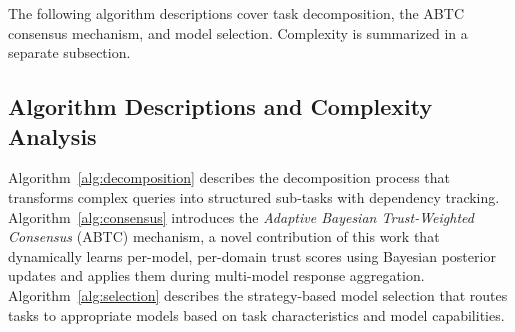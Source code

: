 \documentclass{iopjournal}
\newenvironment{algorithmic}[1][]{\begin{quote}\small}{\end{quote}}
\newcommand{\Require}{\textbf{Require:} }
\newcommand{\Ensure}{\textbf{Ensure:} }
\newcommand{\State}{\par\noindent}
\newcommand{\Comment}[1]{\hfill{\footnotesize(\textit{##1})}}
\newcommand{\For}[1]{\par\noindent\textbf{for} ##1 \textbf{do}}
\newcommand{\EndFor}{\par\noindent\textbf{end for}}
\newcommand{\If}[1]{\par\noindent\textbf{if} ##1 \textbf{then}}
\newcommand{\EndIf}{\par\noindent\textbf{end if}}
\newcommand{\Return}{\par\noindent\textbf{return} }
\begin{document}

The following algorithm descriptions cover task decomposition, the ABTC consensus mechanism, and model selection. Complexity is summarized in a separate subsection.

\subsection{Algorithm Descriptions and Complexity Analysis}

Algorithm~\ref{alg:decomposition} describes the decomposition process that transforms complex queries into structured sub-tasks with dependency tracking. Algorithm~\ref{alg:consensus} introduces the \emph{Adaptive Bayesian Trust-Weighted Consensus} (ABTC) mechanism, a novel contribution of this work that dynamically learns per-model, per-domain trust scores using Bayesian posterior updates and applies them during multi-model response aggregation. Algorithm~\ref{alg:selection} describes the strategy-based model selection that routes tasks to appropriate models based on task characteristics and model capabilities.
\end{document}
